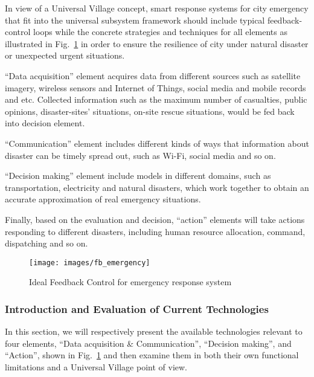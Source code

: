 \documentclass[letterpaper, twocolumn, 10pt, conference]{IEEEtran}
\begin{document}
In view of a Universal Village concept, smart response systems for city emergency that fit into the universal subsystem framework should include  typical feedback-control loops while the concrete strategies and techniques for all elements as illustrated in Fig.~\ref{fig:zj:smart_emergency_feedback} in order to ensure the resilience of city under natural disaster or unexpected urgent situations.

\enquote{Data acquisition} element acquires data from different sources such as satellite imagery, wireless sensors and Internet of Things, social media and mobile records and etc. Collected information such as the maximum number of casualties, public opinions, disaster-sites’ situations, on-site rescue situations, would be fed back into decision element. 

\enquote{Communication} element includes different kinds of ways that information about disaster can be timely spread out, such as Wi-Fi, social media and so on. 

\enquote{Decision making} element include models in different domains, such as transportation, electricity and natural disasters, which work together to obtain an accurate approximation of real emergency situations. 


Finally,  based on the evaluation and decision, \enquote{action} elements will take actions responding to different disasters, including human resource allocation, command, dispatching and so on. 

\begin{figure}[h!]
        \centering
        \texttt{[image: images/fb\_emergency]}
        \caption{Ideal Feedback Control for emergency response system}
        \label{fig:zj:smart_emergency_feedback} 
\end{figure}



\subsubsection{Introduction and Evaluation of Current Technologies}
\label{sssec:zj:smart_emergency:evaluation}

In this section, we will respectively present the available technologies relevant to four elements, \enquote{Data acquisition \& Communication}, \enquote{Decision making}, and  \enquote{Action},  shown in Fig.~\ref{fig:zj:smart_emergency_feedback} and then examine them in both their own functional limitations and a Universal Village point of view.
\end{document}
